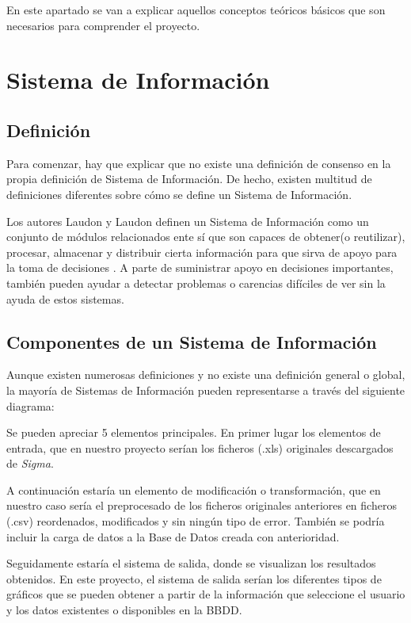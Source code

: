 
En este apartado se van a explicar aquellos conceptos teóricos básicos que son necesarios para comprender el proyecto.


\section{Sistema de Información}



\subsection{Definición}

Para comenzar, hay que explicar que no existe una definición de consenso en la propia definición de Sistema de Información. De hecho, existen multitud de definiciones diferentes sobre cómo se define un Sistema de Información.


Los autores Laudon y Laudon definen un Sistema de Información como un conjunto de módulos relacionados ente sí que son capaces de obtener(o reutilizar), procesar, almacenar y distribuir cierta información para que sirva de apoyo para la toma de decisiones \cite{vicen}.
A parte de suministrar apoyo en decisiones importantes, también pueden ayudar a detectar problemas o carencias difíciles de ver sin la ayuda de estos sistemas.


\subsection{Componentes de un Sistema de Información}
Aunque existen numerosas definiciones y no existe una definición general o global, la mayoría de Sistemas de Información pueden representarse a través del siguiente diagrama:

Se pueden apreciar 5 elementos principales. En primer lugar los elementos de entrada, que en nuestro proyecto serían los ficheros (.xls) originales descargados de \emph{Sigma}. 

A continuación estaría un elemento de modificación o transformación, que en nuestro caso sería el preprocesado de los ficheros originales anteriores en ficheros (.csv) reordenados, modificados y sin ningún tipo de error. También se podría incluir la carga de datos a la Base de Datos creada con anterioridad.

Seguidamente estaría el sistema de salida, donde se visualizan los resultados obtenidos. En este proyecto, el sistema de salida serían los diferentes tipos de gráficos que se pueden obtener a partir de la información que seleccione el usuario y los datos existentes o disponibles en la BBDD.

